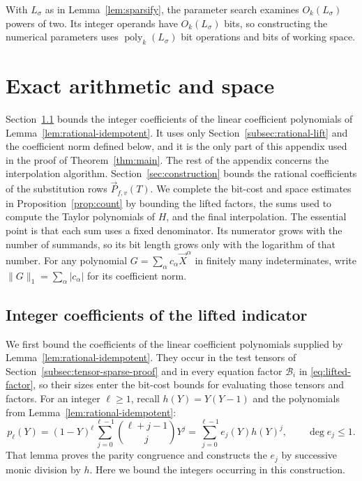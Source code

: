 \documentclass[11pt,reqno]{amsart}
\numberwithin{equation}{section}
\theoremstyle{definition}\newtheorem{definition}[theorem]{Definition}
\theoremstyle{remark}\newtheorem{remark}[theorem]{Remark}
\newcommand{\poly}{\operatorname{poly}}
\renewcommand{\le}{\leqslant}
\renewcommand{\ge}{\geqslant}
\begin{document}
With $L_\sigma$ as in Lemma~\ref{lem:sparsify}, the parameter search
examines $O_k(L_\sigma)$ powers of two. Its integer operands have
$O_k(L_\sigma)$ bits, so constructing the numerical parameters uses
$\poly_k(L_\sigma)$ bit operations and bits of working space.

\section{Exact arithmetic and space}\label{app:arithmetic}
Section~\ref{subsec:rational-lift-height} bounds the integer
coefficients of the linear coefficient polynomials of
Lemma~\ref{lem:rational-idempotent}. It uses only
Section~\ref{subsec:rational-lift} and the coefficient norm defined
below, and it is the only part of this appendix used in the proof of
Theorem~\ref{thm:main}. The rest of the appendix concerns the
interpolation algorithm.
Section~\ref{sec:construction} bounds the rational coefficients of the
substitution rows $\vec{P}_{f,v}(T)$. We complete the bit-cost and space
estimates in Proposition~\ref{prop:count} by bounding the lifted factors,
the sums used to compute the Taylor polynomials of $H$, and the final
interpolation. The essential point is that each sum uses a fixed
denominator. Its numerator grows with the number of summands, so its
bit length grows only with the logarithm of that number.
For any polynomial $G=\sum_\alpha c_\alpha \vec{X}^{\alpha}$ in finitely
many indeterminates, write $\|G\|_1=\sum_\alpha|c_\alpha|$ for its
coefficient norm.

\subsection{Integer coefficients of the lifted indicator}
\label{subsec:rational-lift-height}
We first bound the coefficients of the linear coefficient polynomials supplied
by Lemma~\ref{lem:rational-idempotent}. They occur in the test tensors
of Section~\ref{subsec:tensor-sparse-proof} and in every equation
factor $\mathcal B_i$ in \eqref{eq:lifted-factor}, so their sizes
enter the bit-cost bounds for evaluating those tensors and factors.
For an integer $\ell\ge1$, recall $h(Y)=Y(Y-1)$ and the polynomials
from Lemma~\ref{lem:rational-idempotent}:
\[
 p_\ell(Y)=(1-Y)^\ell\sum_{j=0}^{\ell-1}
                    \binom{\ell+j-1}{j}Y^j
          =\sum_{j=0}^{\ell-1}e_j(Y)h(Y)^j,
 \qquad \deg e_j\le1.
\]
That lemma proves the parity congruence and constructs the $e_j$ by
successive monic division by $h$. Here we bound the integers occurring
in this construction.
\end{document}
